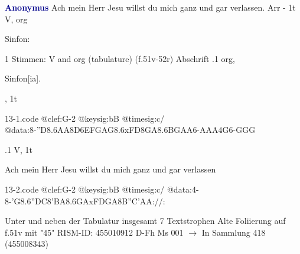 \documentclass[twocolumn]{book}
\begin{document}
\newline \par \vspace{7pt} \textcolor{darkblue}{\textbf{Anonymus  }}
\newline Ach mein Herr Jesu willst du mich ganz und gar verlassen. Arr - 1t
\newline V, org
\newline \begin{itshape}[f.51v, at left:] Sinfon:\end{itshape} 
\newline \textcolor{darkblue}{}  1 Stimmen: V and org (tabulature)  (f.51v-52r)
\newline Abschrift
.1  org, \begin{itshape}Sinfon[ia].\end{itshape}, 1t  
\begin{filecontents*}{13-1.code}
@clef:G-2
@keysig:bB
@timesig:c/
@data:8-''D{8.6AA8D6EF}{GAG8.6xFD}{8GA8.6BG}{AA}6-A{AA}4G6-{GGG}
\end{filecontents*}
\newline
%
.1  V, 1t
\newline \begin{footnotesize} Ach mein Herr Jesu willst du mich ganz und gar verlassen \end{footnotesize}  
\begin{filecontents*}{13-2.code}
@clef:G-2
@keysig:bB
@timesig:c/
@data:4-8-'G{8.6''DC8'BA}{8.6GAxFD}{GA8B''C}{'AA}://:
\end{filecontents*}
\newline
%
\newline Unter und neben der Tabulatur insgesamt 7 Textstrophen
\newline Alte Foliierung auf f.51v mit "45"
\newline RISM-ID: 455010912
\newline D-Fh  Ms 001
\newline $\rightarrow$ In Sammlung 418 (455008343)
      
\end{document}
